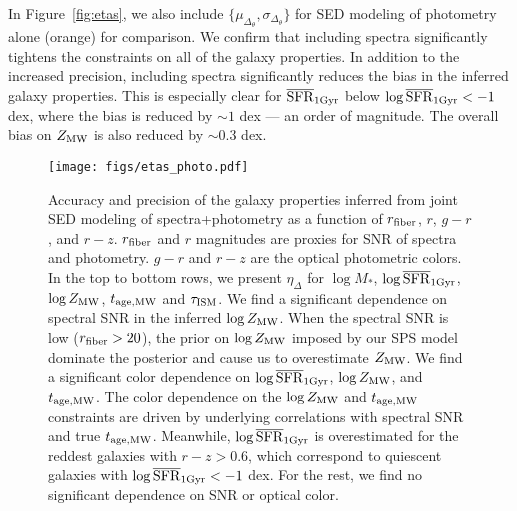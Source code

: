 In Figure~\ref{fig:etas}, we also include $\{\mu_{\Delta_{\theta}},
\sigma_{\Delta_{\theta}}\}$ for SED modeling of photometry alone (orange) for
comparison. 
We confirm that including spectra significantly tightens the constraints on all
of the galaxy properties. 
In addition to the increased precision, including spectra significantly
reduces the bias in the inferred galaxy properties. 
This is especially clear for $\overline{\rm SFR}_{\rm 1Gyr}$ below $\log\overline{\rm SFR}_{\rm 1Gyr} < -1$ dex, where the
bias is reduced by ${\sim}1$ dex --- an order of magnitude. 
The overall bias on $Z_{\rm MW}$ is also reduced by $\sim0.3$ dex. 

\begin{figure}
\begin{center}
    \texttt{[image: figs/etas\_photo.pdf]}
    \caption{
        Accuracy and precision of the galaxy properties inferred from joint SED
        modeling of spectra+photometry as a function of $r_{\rm fiber}$, $r$,
        $g-r$, and $r-z$.
        $r_{\rm fiber}$ and $r$ magnitudes are proxies for SNR of spectra and
        photometry. 
        $g-r$ and $r-z$ are the optical photometric colors. 
        In the top to bottom rows, we present $\eta_\Delta$ for $\log M_*$,
        $\log\overline{\rm SFR}_{\rm 1Gyr}$, $\log Z_{\rm MW}$, $t_{\rm age, MW}$ and $\tau_{\rm ISM}$.
        We find a significant dependence on spectral SNR in the inferred 
        $\log Z_{\rm MW}$. 
        When the spectral SNR is low ($r_{\rm fiber} > 20$), the prior on 
        $\log Z_{\rm MW}$ imposed by our SPS model dominate the posterior and
        cause us to overestimate $Z_{\rm MW}$. 
        We find a significant color dependence on $\log\overline{\rm SFR}_{\rm 1Gyr}$, $\log Z_{\rm
        MW}$, and $t_{\rm age, MW}$. 
        The color dependence on the $\log Z_{\rm MW}$ and $t_{\rm age, MW}$ constraints are
        driven by underlying correlations with spectral SNR and true $t_{\rm age, MW}$. 
        Meanwhile, $\log\overline{\rm SFR}_{\rm 1Gyr}$ is overestimated for the reddest galaxies with
        $r - z > 0.6$, which correspond to quiescent galaxies with $\log\overline{\rm SFR}_{\rm 1Gyr}
        < -1$ dex. 
        For the rest, we find no significant dependence on SNR or optical
        color. 
    }    
    \label{fig:eta_photo}
\end{center}
\end{figure}



